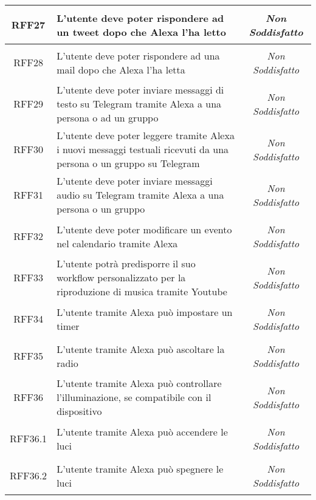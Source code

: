 \begin{longtable}{|c|>{\centering}m{7cm}|c|}
	\hypertarget{RFF27}{RFF27} & L'utente deve poter rispondere ad un tweet dopo che Alexa l'ha letto & \textit{Non Soddisfatto}\\ \hline
	
	\hypertarget{RFF28}{RFF28} & L'utente deve poter rispondere ad una mail dopo che Alexa l'ha letta & \textit{Non Soddisfatto}\\ \hline
	
	\hypertarget{RFF29}{RFF29} & L'utente deve poter inviare messaggi di testo su Telegram tramite Alexa a una persona o ad un gruppo & \textit{Non Soddisfatto}\\ \hline
	
	\hypertarget{RFF30}{RFF30} &  L'utente deve poter leggere tramite Alexa i nuovi messaggi testuali ricevuti da una persona o un gruppo su Telegram & \textit{Non Soddisfatto}\\ \hline
	
	\hypertarget{RFF31}{RFF31} & L'utente deve poter inviare messaggi audio su Telegram tramite Alexa a una persona o un gruppo & \textit{Non Soddisfatto}\\ \hline
	
	\hypertarget{RFF32}{RFF32} & L'utente deve poter modificare un evento nel calendario tramite Alexa & \textit{Non Soddisfatto}\\ \hline
	
	\hypertarget{RFF33}{RFF33} & L'utente potrà predisporre il suo workflow personalizzato per la riproduzione di musica tramite Youtube & \textit{Non Soddisfatto}\\ \hline
	
	\hypertarget{RFF34}{RFF34} & L'utente tramite Alexa può impostare un timer & \textit{Non Soddisfatto}\\ \hline
	
	\hypertarget{RFF35}{RFF35} & L'utente tramite Alexa può ascoltare la radio & \textit{Non Soddisfatto}\\ \hline
	
	\hypertarget{RFF36}{RFF36} & L'utente tramite Alexa può controllare l'illuminazione, se compatibile con il dispositivo & \textit{Non Soddisfatto}\\ \hline
	
	\hypertarget{RFF36.1}{RFF36.1} & L'utente tramite Alexa può accendere le luci & \textit{Non Soddisfatto}\\ \hline
	
	\hypertarget{RFF36.2}{RFF36.2} & L'utente tramite Alexa può spegnere le luci & \textit{Non Soddisfatto}\\ \hline
	

\end{longtable}
